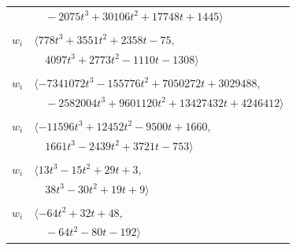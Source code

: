 \documentclass[11pt]{article}
\begin{document}
\begin{longtable}{@{}ll@{}}
 & $\quad -2075t^{3}+30106t^{2}+17748t+1445\rangle$\\
\addlinespace[2pt]
\multicolumn{2}{@{}p{0.97\textwidth}@{}}{$i=27$, $D_i=128$, $\rho_{ij}$: $0{:}1, \allowbreak 4{:}2, \allowbreak 8{:}2, \allowbreak 15{:}1, \allowbreak 29{:}2, \allowbreak 32{:}1, \allowbreak 35{:}1, \allowbreak 36{:}1, \allowbreak 42{:}1, \allowbreak 44{:}2, \allowbreak 57{:}2$}\\
$w_i$ & $\langle 778t^{3}+3551t^{2}+2358t-75,$\\
 & $\quad 4097t^{3}+2773t^{2}-1110t-1308\rangle$\\
\addlinespace[2pt]
\multicolumn{2}{@{}p{0.97\textwidth}@{}}{$i=28$, $D_i=262144$, $\rho_{ij}$: $4{:}2, \allowbreak 10{:}1, \allowbreak 11{:}1, \allowbreak 12{:}2, \allowbreak 15{:}1, \allowbreak 19{:}2, \allowbreak 30{:}1, \allowbreak 42{:}2, \allowbreak 45{:}2, \allowbreak 46{:}2, \allowbreak 47{:}1, \allowbreak 51{:}2, \allowbreak 54{:}1, \allowbreak 57{:}2, \allowbreak 58{:}2, \allowbreak 60{:}1$}\\
$w_i$ & $\langle -7341072t^{3}-155776t^{2}+7050272t+3029488,$\\
 & $\quad -2582004t^{3}+9601120t^{2}+13427432t+4246412\rangle$\\
\addlinespace[2pt]
\multicolumn{2}{@{}p{0.97\textwidth}@{}}{$i=29$, $D_i=128$, $\rho_{ij}$: $5{:}1, \allowbreak 8{:}1, \allowbreak 27{:}1, \allowbreak 35{:}1, \allowbreak 36{:}2, \allowbreak 44{:}2, \allowbreak 65{:}2, \allowbreak 67{:}2, \allowbreak 69{:}2, \allowbreak 71{:}2$}\\
$w_i$ & $\langle -11596t^{3}+12452t^{2}-9500t+1660,$\\
 & $\quad 1661t^{3}-2439t^{2}+3721t-753\rangle$\\
\addlinespace[2pt]
\multicolumn{2}{@{}p{0.97\textwidth}@{}}{$i=30$, $D_i=4$, $\rho_{ij}$: $4{:}1, \allowbreak 28{:}2, \allowbreak 33{:}2, \allowbreak 38{:}2, \allowbreak 45{:}2, \allowbreak 62{:}2, \allowbreak 63{:}1$}\\
$w_i$ & $\langle 13t^{3}-15t^{2}+29t+3,$\\
 & $\quad 38t^{3}-30t^{2}+19t+9\rangle$\\
\addlinespace[2pt]
\multicolumn{2}{@{}p{0.97\textwidth}@{}}{$i=31$, $D_i=16$, $\rho_{ij}$: $11{:}1, \allowbreak 12{:}1, \allowbreak 16{:}2, \allowbreak 44{:}1, \allowbreak 57{:}1, \allowbreak 58{:}1, \allowbreak 59{:}1, \allowbreak 63{:}2, \allowbreak 64{:}2$}\\
$w_i$ & $\langle -64t^{2}+32t+48,$\\
 & $\quad -64t^{2}-80t-192\rangle$\\

\end{longtable}
\end{document}
